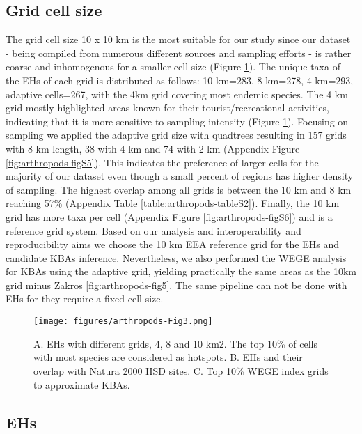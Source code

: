     \subsection{Grid cell size}
    \label{subsec:arthropods-grids}
The grid cell size 10 x 10 km is the most suitable for our study since our
dataset - being compiled from numerous different sources and sampling efforts -
is rather coarse and inhomogenous for a smaller cell size (Figure \ref{fig:arthropods-fig3}).
The unique taxa of the EHs of each grid is distributed as follows: 10 km=283,
8 km=278, 4 km=293, adaptive cells=267, with the 4km grid covering most endemic
species. The 4 km grid mostly highlighted areas known for their tourist/recreational activities,
indicating that it is more sensitive to sampling intensity (Figure \ref{fig:arthropods-fig3}).
Focusing on sampling we applied the adaptive grid size with quadtrees resulting
in 157 grids with 8 km length, 38 with 4 km and 74 with 2 km (Appendix Figure \ref{fig:arthropods-figS5}).
This indicates the preference of larger cells for the majority of our dataset
even though a small percent of regions has higher density of sampling.
The highest overlap among all grids is between the 10 km and 8 km reaching
57\% (Appendix Table \ref{table:arthropods-tableS2}). Finally, the 10 km grid has more taxa
per cell (Appendix Figure \ref{fig:arthropods-figS6}) and is a reference grid system.
Based on our analysis and interoperability and reproducibility aims we choose
the 10 km EEA reference grid for the EHs and candidate KBAs inference.
Nevertheless, we also performed the WEGE analysis for KBAs using the adaptive
grid, yielding practically the same areas as the 10km grid minus Zakros \ref{fig:arthropods-fig5}.
The same pipeline can not be done with EHs for they require a fixed cell size.

   \begin{figure}[h]
      \centering
      \texttt{[image: figures/arthropods-Fig3.png]}
      \caption[Grids, hotspots and potential KBAs of Cretan endemic arthropods]{A. EHs with different grids, 4, 8 and 10 km2. The top 10\% of cells with most species are considered as hotspots. B. EHs and their overlap with Natura 2000 HSD sites. C. Top 10\% WEGE index grids to approximate KBAs.}
      \label{fig:arthropods-fig3}
   \end{figure}


    \subsection{EHs}
    \label{subsec:EHs}

